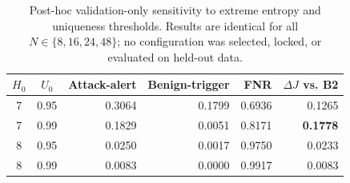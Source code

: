 \begin{table}[t]
\centering
\caption{Post-hoc validation-only sensitivity to extreme entropy and uniqueness thresholds. Results are identical for all $N\in\{8,16,24,48\}$; no configuration was selected, locked, or evaluated on held-out data.}
\label{tab:rq2-posthoc-sensitivity}
\footnotesize
\begin{tabular}{ccrrrr}
\hline
$H_0$ & $U_0$ & Attack-alert & Benign-trigger & FNR & $\Delta J$ vs. B2 \\
\hline
7 & 0.95 & 0.3064 & 0.1799 & 0.6936 & 0.1265 \\
7 & 0.99 & 0.1829 & 0.0051 & 0.8171 & \textbf{0.1778} \\
8 & 0.95 & 0.0250 & 0.0017 & 0.9750 & 0.0233 \\
8 & 0.99 & 0.0083 & 0.0000 & 0.9917 & 0.0083 \\
\hline
\end{tabular}
\end{table}
